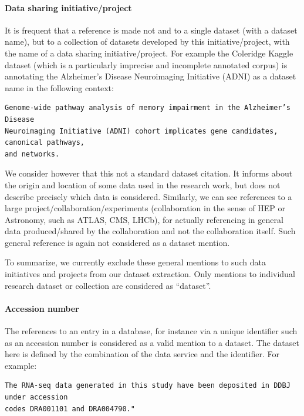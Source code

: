 \documentclass[
]{article}
\begin{document}
\hypertarget{data-sharing-initiativeproject}{%
\paragraph{Data sharing
initiative/project}\label{data-sharing-initiativeproject}}

It is frequent that a reference is made not and to a single dataset
(with a dataset name), but to a collection of datasets developed by this
initiative/project, with the name of a data sharing initiative/project.
For example the Coleridge Kaggle dataset (which is a particularly
imprecise and incomplete annotated corpus) is annotating the Alzheimer's
Disease Neuroimaging Initiative (ADNI) as a dataset name in the
following context:

\begin{verbatim}
Genome-wide pathway analysis of memory impairment in the Alzheimer’s Disease 
Neuroimaging Initiative (ADNI) cohort implicates gene candidates, canonical pathways, 
and networks.
\end{verbatim}

We consider however that this not a standard dataset citation. It
informs about the origin and location of some data used in the research
work, but does not describe precisely which data is considered.
Similarly, we can see references to a large
project/collaboration/experiments (collaboration in the sense of HEP or
Astronomy, such as ATLAS, CMS, LHCb), for actually referencing in
general data produced/shared by the collaboration and not the
collaboration itself. Such general reference is again not considered as
a dataset mention.

To summarize, we currently exclude these general mentions to such data
initiatives and projects from our dataset extraction. Only mentions to
individual research dataset or collection are considered as ``dataset''.

\hypertarget{accession-number}{%
\paragraph{Accession number}\label{accession-number}}

The references to an entry in a database, for instance via a unique
identifier such as an accession number is considered as a valid mention
to a dataset. The dataset here is defined by the combination of the data
service and the identifier. For example:

\begin{verbatim}
The RNA-seq data generated in this study have been deposited in DDBJ under accession 
codes DRA001101 and DRA004790."
\end{verbatim}
\end{document}
